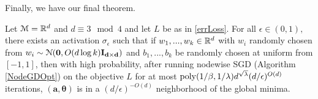 Finally, we have our final theorem.

\begin{theorem}\label{nodewiseSGD}
Let $\mathcal{M} = {\mathbb{R}}^{d}$ and $d \equiv 3 \mod 4$ and let $L$ be as in \ref{errLoss}. For all $\epsilon \in (0,1),$ there exists an activation $\sigma_\epsilon$ such that if $w_1,...,w_k \in {\mathbb{R}}^d$ with $w_i$ randomly chosen from $w_i \sim  \mathcal{N}({\bf 0}, O(d\log k){\bf I_{d\times d}})$ and $b_1,...,b_k$ be randomly chosen at uniform from $[-1,1]$, then with high probability, after running nodewise SGD (Algorithm \ref{NodeGDOpt}) on the objective $L$ for at most $\mathrm{poly}(1/\beta,1/\lambda)d^{\sqrt{\lambda}}(d/\epsilon)^{O(d)}$ iterations, $\boldsymbol{(a,\theta)}$ is in a $(d/\epsilon)^{-O(d)}$ neighborhood of the global minima.
\end{theorem}

